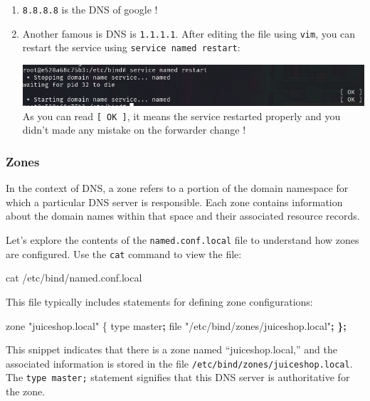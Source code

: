 \documentclass[a4paper,11pt,singlespacing]{article}
\newenvironment{Shaded}{}{}
\newcommand{\BuiltInTok}[1]{\textcolor[rgb]{0.00,0.50,0.00}{#1}}
\newcommand{\ErrorTok}[1]{\textcolor[rgb]{1.00,0.00,0.00}{\textbf{#1}}}
\newcommand{\ExtensionTok}[1]{#1}
\newcommand{\FunctionTok}[1]{\textcolor[rgb]{0.02,0.16,0.49}{#1}}
\newcommand{\KeywordTok}[1]{\textcolor[rgb]{0.00,0.44,0.13}{\textbf{#1}}}
\newcommand{\NormalTok}[1]{#1}
\newcommand{\StringTok}[1]{\textcolor[rgb]{0.25,0.44,0.63}{#1}}
\begin{document}
\begin{enumerate}
\def\labelenumi{\arabic{enumi}.}
\item
  \texttt{8.8.8.8} is the DNS of google !
\item
  Another famous is DNS is \texttt{1.1.1.1}. After editing the file
  using \texttt{vim}, you can restart the service using
  \texttt{service\ named\ restart}:

  \includegraphics{Images/Image11.png}
  As you can read \texttt{{[}\ OK\ {]}}, it means the service restarted
  properly and you didn't made any mistake on the forwarder change !
\end{enumerate}

\subsubsection{Zones}\label{zones}

In the context of DNS, a zone refers to a portion of the domain
namespace for which a particular DNS server is responsible. Each zone
contains information about the domain names within that space and their
associated resource records.

Let's explore the contents of the \texttt{named.conf.local} file to
understand how zones are configured. Use the \texttt{cat} command to
view the file:

\begin{Shaded}
\begin{Highlighting}[]
\FunctionTok{cat}\NormalTok{ /etc/bind/named.conf.local}
\end{Highlighting}
\end{Shaded}

This file typically includes statements for defining zone
configurations:

\begin{Shaded}
\begin{Highlighting}[]
\ExtensionTok{zone} \StringTok{"juiceshop.local"}\NormalTok{ \{}
    \BuiltInTok{type}\NormalTok{ master}\KeywordTok{;}
    \FunctionTok{file} \StringTok{"/etc/bind/zones/juiceshop.local"}\KeywordTok{;}
\ErrorTok{\}}\KeywordTok{;}
\end{Highlighting}
\end{Shaded}

This snippet indicates that there is a zone named ``juiceshop.local,''
and the associated information is stored in the file
\texttt{/etc/bind/zones/juiceshop.local}. The \texttt{type\ master;}
statement signifies that this DNS server is authoritative for the zone.
\end{document}
